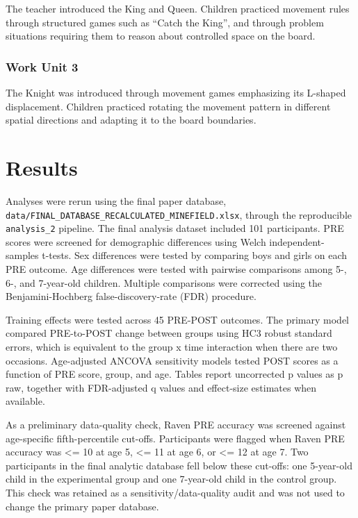 \documentclass[
  letterpaper,
  DIV=11,
  numbers=noendperiod]{scrartcl}
\begin{document}
The teacher introduced the King and Queen. Children practiced movement
rules through structured games such as ``Catch the King'', and through
problem situations requiring them to reason about controlled space on
the board.

\subsubsection{Work Unit 3}\label{work-unit-3}

The Knight was introduced through movement games emphasizing its
L-shaped displacement. Children practiced rotating the movement pattern
in different spatial directions and adapting it to the board boundaries.

\section{Results}\label{results}

Analyses were rerun using the final paper database,
\texttt{data/FINAL\_DATABASE\_RECALCULATED\_MINEFIELD.xlsx}, through the
reproducible \texttt{analysis\_2} pipeline. The final analysis dataset
included 101 participants. PRE scores were screened for demographic
differences using Welch independent-samples t-tests. Sex differences
were tested by comparing boys and girls on each PRE outcome. Age
differences were tested with pairwise comparisons among 5-, 6-, and
7-year-old children. Multiple comparisons were corrected using the
Benjamini-Hochberg false-discovery-rate (FDR) procedure.

Training effects were tested across 45 PRE-POST outcomes. The primary
model compared PRE-to-POST change between groups using HC3 robust
standard errors, which is equivalent to the group x time interaction
when there are two occasions. Age-adjusted ANCOVA sensitivity models
tested POST scores as a function of PRE score, group, and age. Tables
report uncorrected p values as p raw, together with FDR-adjusted q
values and effect-size estimates when available.

As a preliminary data-quality check, Raven PRE accuracy was screened
against age-specific fifth-percentile cut-offs. Participants were
flagged when Raven PRE accuracy was \textless= 10 at age 5, \textless=
11 at age 6, or \textless= 12 at age 7. Two participants in the final
analytic database fell below these cut-offs: one 5-year-old child in the
experimental group and one 7-year-old child in the control group. This
check was retained as a sensitivity/data-quality audit and was not used
to change the primary paper database.
\end{document}
